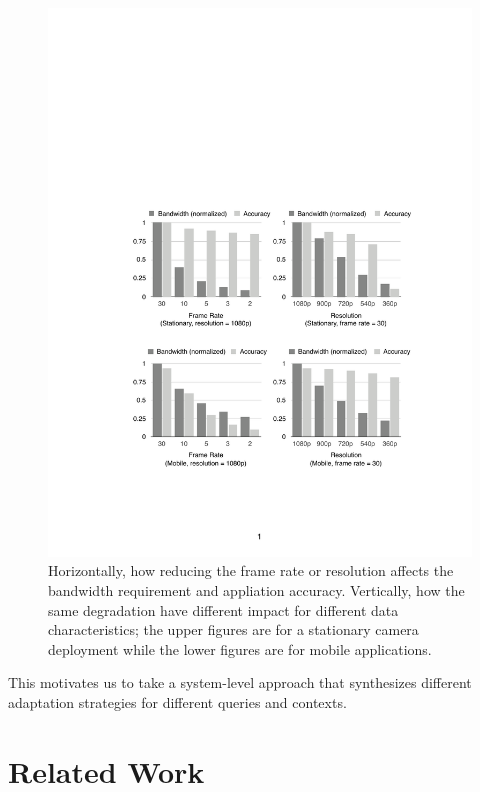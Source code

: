 \begin{figure}
  \centering
  \includegraphics[width=\linewidth]{figures/motiv.pdf}
  \caption{Horizontally, how reducing the frame rate or resolution affects the
    bandwidth requirement and appliation accuracy. Vertically, how the same
    degradation have different impact for different data characteristics; the
    upper figures are for a stationary camera deployment while the lower figures
    are for mobile applications.}
  \label{fig:motiv}
\end{figure}

This motivates us to take a system-level approach that synthesizes different
adaptation strategies for different queries and contexts.

\section{Related Work}
\label{sec:related-work}


